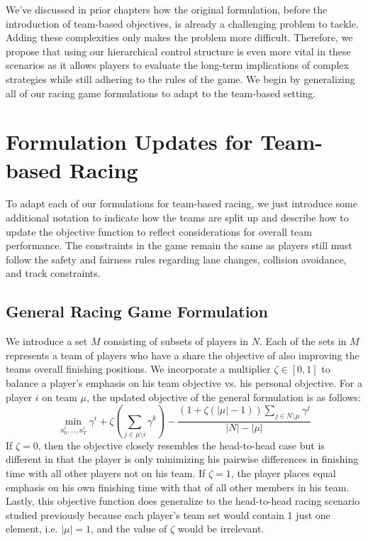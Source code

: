We've discussed in prior chapters how the original formulation, before the introduction of team-based objectives, is already a challenging problem to tackle. Adding these complexities only makes the problem more difficult. Therefore, we propose that using our hierarchical control structure is even more vital in these scenarios as it allows players to evaluate the long-term implications of complex strategies while still adhering to the rules of the game. We begin by generalizing all of our racing game formulations to adapt to the team-based setting.

\section{Formulation Updates for Team-based Racing}
To adapt each of our formulations for team-based racing, we just introduce some additional notation to indicate how the teams are split up and describe how to update the objective function to reflect considerations for overall team performance. The constraints in the game remain the same as players still must follow the safety and fairness rules regarding lane changes, collision avoidance, and track constraints.
\subsection{General Racing Game Formulation}
We introduce a set $M$ consisting of subsets of players in $N$. Each of the sets in $M$ represents a team of players who have a share the objective of also improving the teams overall finishing positions. We incorporate a multiplier $\zeta \in [0,1]$ to balance a player's emphasis on his team objective vs. his personal objective. For a player $i$ on team $\mu$, the updated objective of the general formulation is as follows:
\begin{equation} \label{eq:gen_team_obj}
    \min_{u^i_0, ..., u^i_T} \gamma^i+\zeta (\sum_{j \in \mu \setminus i} \gamma^k) - \frac{(1+\zeta(|\mu|-1))\sum_{j \in N \setminus \mu }\gamma^j}{|N|-|\mu|} 
\end{equation}
If $\zeta=0$, then the objective closely resembles the head-to-head case but is different in that the player is only minimizing his pairwise differences in finishing time with all other players not on his team. If $\zeta=1$, the player places equal emphasis on his own finishing time with that of all other members in his team. Lastly, this objective function does generalize to the head-to-head racing scenario studied previously because each player's team set would contain 1 just one element, i.e. $|\mu|=1$, and the value of $\zeta$ would be irrelevant. 


